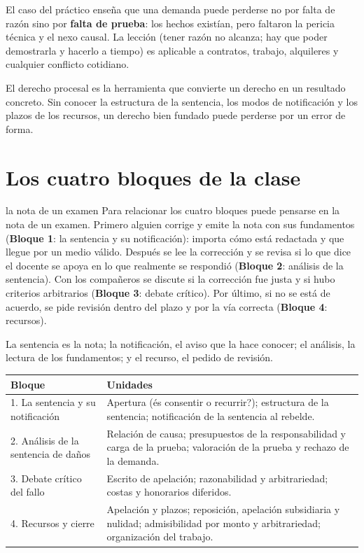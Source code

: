 \documentclass[12pt,oneside]{book}
\begin{document}
El caso del pr\'actico ense\~na que una demanda puede perderse no por falta de raz\'on sino por \textbf{falta de prueba}: los hechos exist\'ian, pero faltaron la pericia t\'ecnica y el nexo causal. La lecci\'on (tener raz\'on no alcanza; hay que poder demostrarla y hacerlo a tiempo) es aplicable a contratos, trabajo, alquileres y cualquier conflicto cotidiano.

El derecho procesal es la herramienta que convierte un derecho en un resultado concreto. Sin conocer la estructura de la sentencia, los modos de notificaci\'on y los plazos de los recursos, un derecho bien fundado puede perderse por un error de forma.

\section{Los cuatro bloques de la clase}

\begin{example}{la nota de un examen}
Para relacionar los cuatro bloques puede pensarse en la nota de un examen. Primero alguien corrige y emite la nota con sus fundamentos (\textbf{Bloque 1}: la sentencia y su notificaci\'on): importa c\'omo est\'a redactada y que llegue por un medio v\'alido. Despu\'es se lee la correcci\'on y se revisa si lo que dice el docente se apoya en lo que realmente se respondi\'o (\textbf{Bloque 2}: an\'alisis de la sentencia). Con los compa\~neros se discute si la correcci\'on fue justa y si hubo criterios arbitrarios (\textbf{Bloque 3}: debate cr\'itico). Por \'ultimo, si no se est\'a de acuerdo, se pide revisi\'on dentro del plazo y por la v\'ia correcta (\textbf{Bloque 4}: recursos).

La sentencia es la nota; la notificaci\'on, el aviso que la hace conocer; el an\'alisis, la lectura de los fundamentos; y el recurso, el pedido de revisi\'on.
\end{example}

\begin{center}
\small
\begin{tabularx}{\textwidth}{@{}p{3.2cm}X@{}}
\toprule
\textbf{Bloque} & \textbf{Unidades} \\
\midrule
1. La sentencia y su notificaci\'on & Apertura (\'es consentir o recurrir?); estructura de la sentencia; notificaci\'on de la sentencia al rebelde. \\
2. An\'alisis de la sentencia de da\~nos & Relaci\'on de causa; presupuestos de la responsabilidad y carga de la prueba; valoraci\'on de la prueba y rechazo de la demanda. \\
3. Debate cr\'itico del fallo & Escrito de apelaci\'on; razonabilidad y arbitrariedad; costas y honorarios diferidos. \\
4. Recursos y cierre & Apelaci\'on y plazos; reposici\'on, apelaci\'on subsidiaria y nulidad; admisibilidad por monto y arbitrariedad; organizaci\'on del trabajo. \\
\bottomrule
\end{tabularx}
\end{center}
\end{document}
